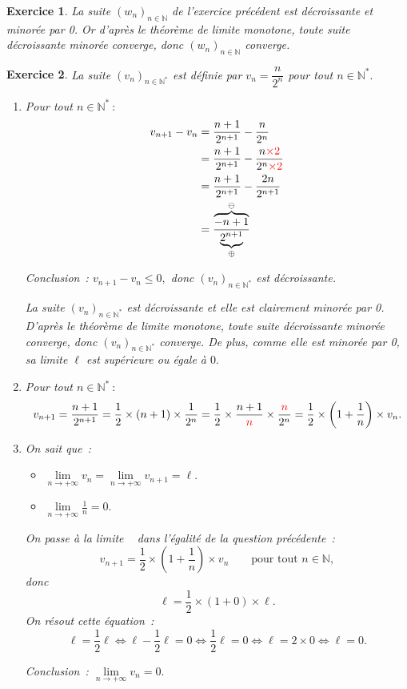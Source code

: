 \documentclass[10pt]{article}
\newtheorem{exo}{Exercice}
\begin{document}
\begin{exo}

La suite $(w_n)_{n\in\mathbb{N}}$ de l'exercice précédent est décroissante et minorée par 0. Or d'après le théorème de limite monotone, toute suite décroissante minorée converge, donc $(w_n)_{n\in\mathbb{N}}$ converge.

\end{exo}

\begin{exo}

La suite $(v_n)_{n\in\mathbb{N}^*}$ est définie par $v_n=\dfrac{n}{2^n}$ pour tout $n\in\mathbb{N}^*.$ 


\begin{enumerate}
\item Pour tout $n\in\mathbb{N}^*~:$
\begin{align*}v_{n+1}-v_{n}&=\dfrac{n+1}{2^{n+1}}-\dfrac{n}{2^n}
\\&=\dfrac{n+1}{2^{n+1}}-\dfrac{n\textcolor{red}{\times 2}}{2^n\textcolor{red}{\times 2}}
\\&=\dfrac{n+1}{2^{n+1}}-\dfrac{2n}{2^{n+1}}
\\&=\dfrac{\overbrace{-n+1}^{\ominus}}{\underbrace{2^{n+1}}_{\oplus}}
\end{align*}


Conclusion~: $v_{n+1}-v_{n}\leq 0,$ donc $\left(v_n\right)_{n\in\mathbb{N}^*}$ est décroissante.
\medskip

La suite $(v_n)_{n\in\mathbb{N}^*}$ est décroissante et elle est clairement minorée par 0. D'après le théorème de limite monotone, toute suite décroissante minorée converge, donc $(v_n)_{n\in\mathbb{N}^*}$ converge. De plus, comme elle est minorée par 0, sa limite $\ell$ est supérieure ou égale à $0.$
\item Pour tout $n\in\mathbb{N}^*~:$
\[v_{n+1}=\frac{n+1}{2^{n+1}}=\frac{1}{2}\times(n+1)\times\frac{1}{2^n}=\frac{1}{2}\times\frac{n+1}{\textcolor{red}{n}}\times\frac{\textcolor{red}{n}}{2^n}=\frac{1}{2}\times\left(1+\frac{1}{n}\right)\times v_n.\]
\item On sait que~:
\begin{itemize}
\item[\textbullet] $\lim\limits_{n\to +\infty}v_n=\lim\limits_{n\to +\infty} v_{n+1}=\ell.$
\item[\textbullet] $\lim\limits_{n\to +\infty}\frac{1}{n}=0.$
\end{itemize}

On \og passe à la limite  \fg~{} dans l'égalité de la question précédente~:
\[v_{n+1}=\frac{1}{2}\times\left(1+\frac{1}{n}\right)\times v_n\qquad\text{pour tout }n\in\mathbb{N},\]
donc
\[\ell=\frac{1}{2}\times\left(1+0\right)\times \ell.\]
On résout cette équation~:
\[\ell=\frac{1}{2}\ell\iff \ell-\frac{1}{2}\ell=0\iff \frac{1}{2}\ell=0\iff \ell=2\times 0\iff \ell=0.\]



Conclusion~: $\lim\limits_{n\to +\infty}v_n=0.$


\end{enumerate}

\end{exo}
\end{document}
